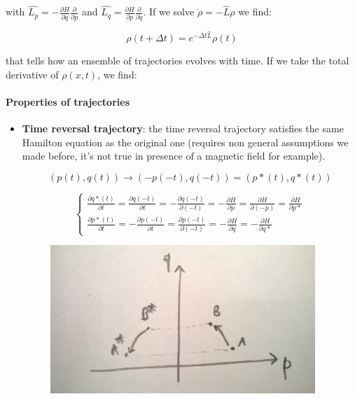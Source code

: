 \documentclass[a4paper, italian, openany]{book}
\begin{document}
with $\hat{L_p} = -\frac{\partial H}{\partial q} \frac{\partial}{\partial p}$ and $\hat{L_q} = \frac{\partial H}{\partial p} \frac{\partial}{\partial q}$. If we solve $\dot{\rho} = - \hat{L} \rho$ we find:

$$\rho(t+\Delta t) = e^{-\Delta t \hat{L}} \rho(t)$$

that tells how an ensemble of trajectories evolves with time. If we take the total derivative of $\rho (x, t)$, we find:



\paragraph{Properties of trajectories}

\begin{itemize}
\item \textbf{Time reversal trajectory}: the time reversal trajectory satisfies the same Hamilton equation as the original one (requires non general assumptions we made before, it's not true in presence of a magnetic field for example).

$$(p(t), q(t)) \to (-p(-t), q(-t)) = (p*(t), q*(t))$$

$$\begin{cases}
\frac{\partial q*(t)}{\partial t} = \frac{\partial q(-t)}{\partial t} = - \frac{\partial q(-t)}{\partial (-t)} = - \frac{\partial  H}{\partial p} =  \frac{\partial  H}{\partial (-p)} =  \frac{\partial  H}{\partial p*}\\
\frac{\partial p*(t)}{\partial t} = - \frac{\partial p(-t)}{\partial t} = \frac{\partial p(-t)}{\partial (-t)} = - \frac{\partial  H}{\partial q} = - \frac{\partial  H}{\partial q*}
\end{cases}$$

\begin{figure}[H]
\centering
\includegraphics[width=100mm]{img/pic3.jpg}
\end{figure}


\end{itemize}
\end{document}
